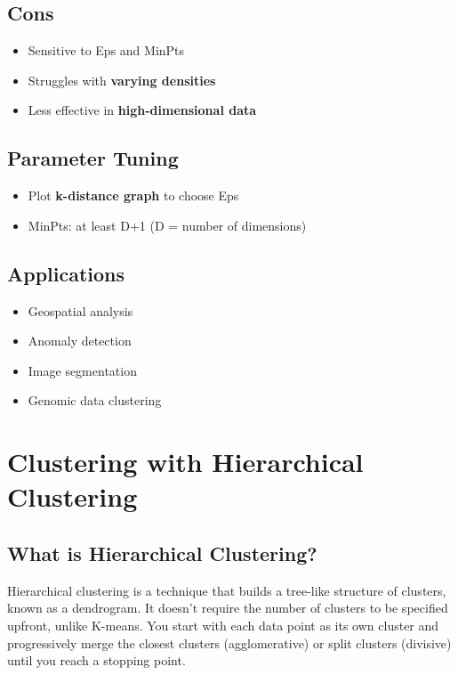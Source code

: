\documentclass[
  letterpaper,
  DIV=11,
  numbers=noendperiod]{scrreprt}
\providecommand{\tightlist}{%
  \setlength{\itemsep}{0pt}\setlength{\parskip}{0pt}}\usepackage{longtable,booktabs,array}
\begin{document}
\subsection{Cons}\label{cons-1}

\begin{itemize}
\tightlist
\item
  Sensitive to Eps and MinPts
\item
  Struggles with \textbf{varying densities}
\item
  Less effective in \textbf{high-dimensional data}
\end{itemize}

\subsection{Parameter Tuning}\label{parameter-tuning}

\begin{itemize}
\tightlist
\item
  Plot \textbf{k-distance graph} to choose Eps
\item
  MinPts: at least D+1 (D = number of dimensions)
\end{itemize}

\subsection{Applications}\label{applications}

\begin{itemize}
\tightlist
\item
  Geospatial analysis
\item
  Anomaly detection
\item
  Image segmentation
\item
  Genomic data clustering
\end{itemize}

\section{Clustering with Hierarchical
Clustering}\label{clustering-with-hierarchical-clustering}

\subsection{What is Hierarchical
Clustering?}\label{what-is-hierarchical-clustering}

Hierarchical clustering is a technique that builds a tree-like structure
of clusters, known as a dendrogram. It doesn't require the number of
clusters to be specified upfront, unlike K-means. You start with each
data point as its own cluster and progressively merge the closest
clusters (agglomerative) or split clusters (divisive) until you reach a
stopping point.
\end{document}

